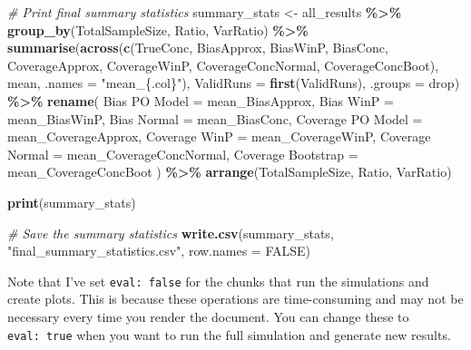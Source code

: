 \documentclass[
  letterpaper,
  DIV=11,
  numbers=noendperiod]{scrartcl}
\newenvironment{Shaded}{\begin{snugshade}}{\end{snugshade}}
\newcommand{\AttributeTok}[1]{\textcolor[rgb]{0.13,0.29,0.53}{#1}}
\newcommand{\CommentTok}[1]{\textcolor[rgb]{0.56,0.35,0.01}{\textit{#1}}}
\newcommand{\ConstantTok}[1]{\textcolor[rgb]{0.56,0.35,0.01}{#1}}
\newcommand{\FunctionTok}[1]{\textcolor[rgb]{0.13,0.29,0.53}{\textbf{#1}}}
\newcommand{\NormalTok}[1]{#1}
\newcommand{\OtherTok}[1]{\textcolor[rgb]{0.56,0.35,0.01}{#1}}
\newcommand{\SpecialCharTok}[1]{\textcolor[rgb]{0.81,0.36,0.00}{\textbf{#1}}}
\newcommand{\StringTok}[1]{\textcolor[rgb]{0.31,0.60,0.02}{#1}}
\begin{document}
\begin{Shaded}
\begin{Highlighting}[]
\CommentTok{\# Print final summary statistics}
\NormalTok{summary\_stats }\OtherTok{\textless{}{-}}\NormalTok{ all\_results }\SpecialCharTok{\%\textgreater{}\%}
  \FunctionTok{group\_by}\NormalTok{(TotalSampleSize, Ratio, VarRatio) }\SpecialCharTok{\%\textgreater{}\%}
  \FunctionTok{summarise}\NormalTok{(}\FunctionTok{across}\NormalTok{(}\FunctionTok{c}\NormalTok{(TrueConc, }
\NormalTok{                     BiasApprox, }
\NormalTok{                     BiasWinP, }
\NormalTok{                     BiasConc,}
\NormalTok{                     CoverageApprox, }
\NormalTok{                     CoverageWinP, }
\NormalTok{                     CoverageConcNormal, }
\NormalTok{                     CoverageConcBoot), }
\NormalTok{                   mean, }\AttributeTok{.names =} \StringTok{"mean\_\{.col\}"}\NormalTok{),}
            \AttributeTok{ValidRuns =} \FunctionTok{first}\NormalTok{(ValidRuns),}
            \AttributeTok{.groups =} \StringTok{\textquotesingle{}drop\textquotesingle{}}\NormalTok{) }\SpecialCharTok{\%\textgreater{}\%}
  \FunctionTok{rename}\NormalTok{(}
    \StringTok{\textasciigrave{}}\AttributeTok{Bias PO Model}\StringTok{\textasciigrave{}} \OtherTok{=}\NormalTok{ mean\_BiasApprox,}
\StringTok{\textasciigrave{}}\AttributeTok{Bias WinP}\StringTok{\textasciigrave{}} \OtherTok{=}\NormalTok{ mean\_BiasWinP,}
    \StringTok{\textasciigrave{}}\AttributeTok{Bias Normal}\StringTok{\textasciigrave{}} \OtherTok{=}\NormalTok{ mean\_BiasConc,}
    \StringTok{\textasciigrave{}}\AttributeTok{Coverage PO Model}\StringTok{\textasciigrave{}} \OtherTok{=}\NormalTok{ mean\_CoverageApprox,}
    \StringTok{\textasciigrave{}}\AttributeTok{Coverage WinP}\StringTok{\textasciigrave{}} \OtherTok{=}\NormalTok{ mean\_CoverageWinP,}
    \StringTok{\textasciigrave{}}\AttributeTok{Coverage Normal}\StringTok{\textasciigrave{}} \OtherTok{=}\NormalTok{ mean\_CoverageConcNormal,}
    \StringTok{\textasciigrave{}}\AttributeTok{Coverage Bootstrap}\StringTok{\textasciigrave{}} \OtherTok{=}\NormalTok{ mean\_CoverageConcBoot}
\NormalTok{  ) }\SpecialCharTok{\%\textgreater{}\%}
  \FunctionTok{arrange}\NormalTok{(TotalSampleSize, Ratio, VarRatio)}

\FunctionTok{print}\NormalTok{(summary\_stats)}

\CommentTok{\# Save the summary statistics}
\FunctionTok{write.csv}\NormalTok{(summary\_stats, }\StringTok{"final\_summary\_statistics.csv"}\NormalTok{, }\AttributeTok{row.names =} \ConstantTok{FALSE}\NormalTok{)}
\end{Highlighting}
\end{Shaded}

Note that I've set \texttt{eval:\ false} for the chunks that run the
simulations and create plots. This is because these operations are
time-consuming and may not be necessary every time you render the
document. You can change these to \texttt{eval:\ true} when you want to
run the full simulation and generate new results.
\end{document}

